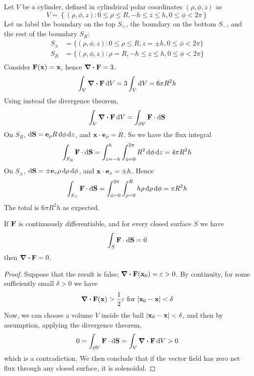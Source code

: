 \begin{example}
	Let \(V\) be a cylinder, defined in cylindrical polar coordinates \((\rho, \phi, z)\) as
	\[
		V = \left\{ (\rho, \phi, z) \colon 0 \leq \rho \leq R, -h \leq z \leq h, 0 \leq \phi < 2 \pi \right\}
	\]
	Let us label the boundary on the top \(S_+\), the boundary on the bottom \(S_-\), and the rest of the boundary \(S_R\):
	\begin{align*}
		S_\pm & = \{ (\rho, \phi, z) \colon 0 \leq \rho \leq R, z = \pm h, 0 \leq \phi < 2 \pi \} \\
		S_R   & = \{ (\rho, \phi, z) \colon \rho = R, -h \leq z \leq h, 0 \leq \phi < 2 \pi \}    \\
	\end{align*}
	Consider \(\vb F(\vb x) = \vb x\), hence \(\div{\vb F} = 3\).
	\[
		\int_V \div{\vb F} \dd{V} = 3 \int_V \dd{V} = 6\pi R^2 h
	\]
	Using instead the divergence theorem,
	\[
		\int_V \div{\vb F} \dd{V} = \int_{\partial V} \vb F \cdot \dd{\vb S}
	\]
	On \(S_R\), \(\dd{\vb S} = \vb e_\rho R \dd{\phi}\dd{z}\), and \(\vb x \cdot \vb e_\rho = R\).
	So we have the flux integral
	\[
		\int_{S_R} \vb F \cdot \dd{\vb S} = \int_{z = -h}^h \int_{\phi = 0}^{2 \pi} R^2 \dd{\phi} \dd{z} = 4\pi R^2 h
	\]
	On \(S_\pm\), \(\dd{\vb S} = \pm \vb e_z \rho \dd{\rho}\dd{\phi}\), and \(\vb x \cdot \vb e_z = \pm h\).
	Hence
	\[
		\int_{S_\pm} \vb F \cdot \dd{\vb S} = \int_{\phi = 0}^{2 \pi} \int_{\rho = 0}^R h \rho\dd{\rho}\dd{\phi} = \pi R^2 h
	\]
	The total is \(6\pi R^2 h\) as expected.
\end{example}

\begin{proposition}
	If \(\vb F\) is continuously differentiable, and for every closed surface \(S\) we have
	\[
		\int_S \vb F \cdot \dd{\vb S} = 0
	\]
	then \(\div{\vb F} = 0\).
\end{proposition}
\begin{proof}
	Suppose that the result is false; \(\div{\vb F}(\vb x_0) = \varepsilon > 0\).
	By continuity, for some sufficiently small \(\delta > 0\) we have
	\[
		\div{\vb F}(\vb x) > \frac{1}{2} \varepsilon \text{ for } \abs{\vb x_0 - \vb x} < \delta
	\]
	Now, we can choose a volume \(V\) inside the ball \(\abs{\vb x_0 - \vb x} < \delta\), and then by assumption, applying the divergence theorem,
	\[
		0 = \int_{\partial V} \vb F \cdot \dd{\vb S} = \int_V \div{\vb F} \dd{V} > 0
	\]
	which is a contradiction.
	We then conclude that if the vector field has zero net flux through any closed surface, it is solenoidal.
\end{proof}

